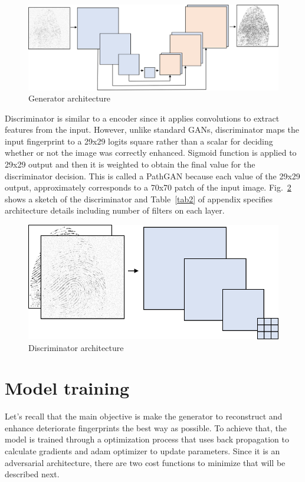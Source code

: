\documentclass[a4paper,fleqn]{cas-dc}
\begin{document}
\begin{figure}[htbp]
\centerline{\includegraphics[scale=0.37]{figs/generator.png}}
\caption{Generator architecture}
\label{fig4}
\end{figure}

Discriminator is similar to a encoder since it applies convolutions to extract features from the input. However, unlike standard GANs, discriminator maps the input fingerprint to a 29x29 logits square rather than a scalar for deciding whether or not the image was correctly enhanced. Sigmoid function is applied to 29x29 output and then it is weighted to obtain the final value for the discriminator decision. This is called a PathGAN because each value of the 29x29 output, approximately corresponds to a 70x70 patch of the input image. Fig.~\ref{fig5} shows a sketch of the discriminator and Table~\ref{tab2} of appendix specifies architecture details including number of filters on each layer.

\begin{figure}[htbp]
\centerline{\includegraphics[scale=0.4]{figs/discriminator.png}}
\caption{Discriminator architecture}
\label{fig5}
\end{figure}

\section{Model training}
\label{sec:MT}

Let's recall that the main objective is make the generator to reconstruct and enhance deteriorate fingerprints the best way as possible. To achieve that, the model is trained through a optimization process that uses back propagation to calculate gradients and adam optimizer to update parameters. Since it is an adversarial architecture, there are two cost functions to minimize that will be described next.
\end{document}
